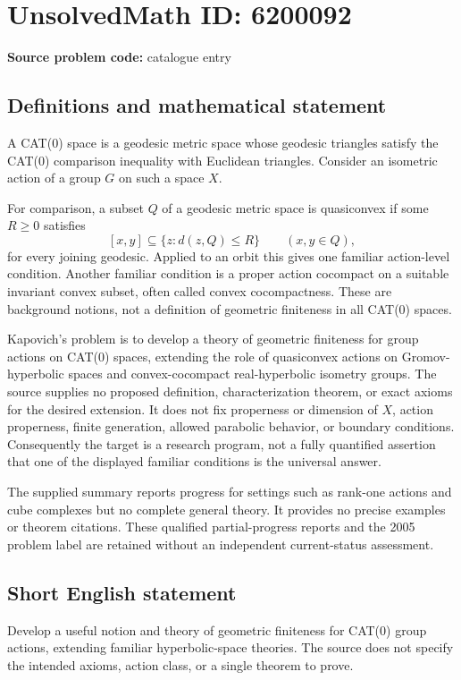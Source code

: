 \documentclass[11pt]{article}
\begin{document}
\section*{UnsolvedMath ID: 6200092}
\textbf{Source problem code:} catalogue entry
\subsection{Definitions and mathematical statement}
A CAT(0) space is a geodesic metric space whose geodesic triangles satisfy the CAT(0) comparison inequality with Euclidean triangles. Consider an isometric action of a group \(G\) on such a space \(X\).

For comparison, a subset \(Q\) of a geodesic metric space is quasiconvex if some \(R\ge0\) satisfies
\[
 [x,y]\subseteq\{z:d(z,Q)\le R\}\qquad(x,y\in Q),
\]
for every joining geodesic. Applied to an orbit this gives one familiar action-level condition. Another familiar condition is a proper action cocompact on a suitable invariant convex subset, often called convex cocompactness. These are background notions, not a definition of geometric finiteness in all CAT(0) spaces.

Kapovich's problem is to develop a theory of geometric finiteness for group actions on CAT(0) spaces, extending the role of quasiconvex actions on Gromov-hyperbolic spaces and convex-cocompact real-hyperbolic isometry groups. The source supplies no proposed definition, characterization theorem, or exact axioms for the desired extension. It does not fix properness or dimension of \(X\), action properness, finite generation, allowed parabolic behavior, or boundary conditions. Consequently the target is a research program, not a fully quantified assertion that one of the displayed familiar conditions is the universal answer.

The supplied summary reports progress for settings such as rank-one actions and cube complexes but no complete general theory. It provides no precise examples or theorem citations. These qualified partial-progress reports and the 2005 problem label are retained without an independent current-status assessment.
\subsection{Short English statement}
Develop a useful notion and theory of geometric finiteness for CAT(0) group actions, extending familiar hyperbolic-space theories. The source does not specify the intended axioms, action class, or a single theorem to prove.
\end{document}
